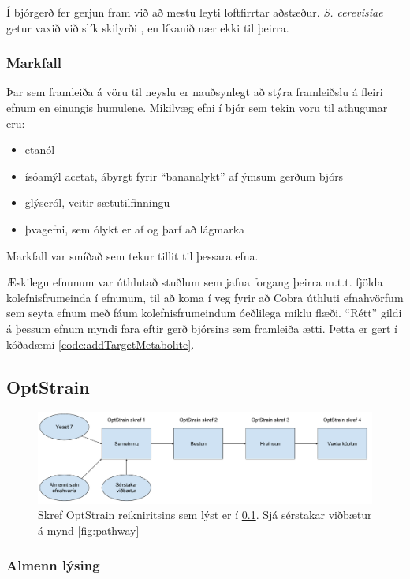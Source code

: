 \documentclass[11pt]{article}
\begin{document}
\begin{multicols}{2}
Í bjórgerð fer gerjun fram við að mestu leyti loftfirrtar aðstæður. \emph{S. cerevisiae} getur vaxið við slík skilyrði \cite{ishtar2007factors}, en líkanið nær ekki til þeirra.
\subsubsection{Markfall}
Þar sem framleiða á vöru til neyslu er nauðsynlegt að stýra framleiðslu á fleiri efnum en einungis humulene. Mikilvæg efni í bjór \cite{dequin2001potential} sem tekin voru til athugunar eru:
\begin{itemize}
 \item etanól
 \item ísóamýl acetat, ábyrgt fyrir ``bananalykt'' af ýmsum gerðum bjórs
 \item glýseról, veitir sætutilfinningu
 \item þvagefni, sem ólykt er af og þarf að lágmarka
\end{itemize}
Markfall var smíðað sem tekur tillit til þessara efna. 

Æskilegu efnunum var úthlutað stuðlum sem jafna forgang þeirra m.t.t. fjölda kolefnisfrumeinda í efnunum, til að koma í veg fyrir að Cobra úthluti efnahvörfum sem seyta efnum með fáum kolefnisfrumeindum óeðlilega miklu flæði. ``Rétt'' gildi á þessum efnum myndi fara eftir gerð bjórsins sem framleiða ætti. Þetta er gert í kóðadæmi \ref{code:addTargetMetabolite}.

\subsection{OptStrain}

\label{sec:optstrain}
\begin{figure}
\caption[OptStrain reikniritið]{Skref OptStrain reikniritsins sem lýst er í \ref{sec:optstrain}. Sjá sérstakar viðbætur á mynd \ref{fig:pathway}}
\label{fig:flaedirit}
\includegraphics[width=\linewidth]{Pics/OptStrainOverview}
\end{figure}
\subsubsection{Almenn lýsing}

\end{multicols}
\end{document}
